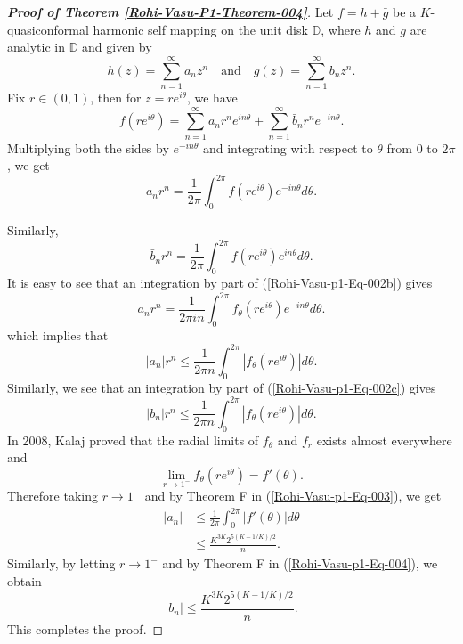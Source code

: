 \documentclass[a4paper,12pt]{amsart}
\theoremstyle{plain}
\theoremstyle{definition}
\begin{document}
\begin{proof}[{\bf Proof of Theorem   \ref{Rohi-Vasu-P1-Theorem-004}}]
 Let $f=h+\bar{g}$ be a $K$-quasiconformal harmonic self mapping on the unit disk $\mathbb{D}$, where $h$ and $g$ are analytic in $\mathbb{D}$ and given by
$$
h(z)=\sum_{n=1}^{\infty} a_n z^n \quad \text{and}
\quad g(z)=\sum_{n=1}^{\infty} b_n z^n.$$
 Fix $r\in (0,1)$, then for $z=r e^{i\theta}$, we have 
$$
f(r e^{i \theta})=\sum_{n=1}^{\infty} a_n r^n e^{i n \theta}+\sum_{n=1}^{\infty} \bar{b}_n r^n e^{-i n \theta}.
$$
Multiplying both the sides by $e^{-i n \theta}$ and integrating with respect to $\theta$ from 0 to $2 \pi$, we get
\begin{equation}\label{Rohi-Vasu-p1-Eq-002b}
a_n r^n=\frac{1}{2 \pi} \int_0^{2 \pi} f\left(r e^{i \theta}\right) e^{-i n \theta} d \theta.
\end{equation}

Similarly,
\begin{equation}\label{Rohi-Vasu-p1-Eq-002c}
\bar{b}_n r^n=\frac{1}{2 \pi} \int_0^{2 \pi} f\left(r e^{i \theta}\right) e^{i n \theta} d \theta.
\end{equation}
It is easy to see that an integration by part of (\ref{Rohi-Vasu-p1-Eq-002b}) gives
$$
 a_n r^n=\frac{1}{2 \pi i n} \int_0^{2 \pi} f_\theta\left(r e^{i \theta}\right) e^{-i n \theta} d \theta. 
$$
which implies that
\begin{equation}\label{Rohi-Vasu-p1-Eq-003}
|a_n| r^n \leq \frac{1}{2 \pi n} \int_0^{2 \pi}\left|f_\theta(r e^{i \theta})\right| d \theta.
\end{equation}
Similarly, we see that an integration by part of (\ref{Rohi-Vasu-p1-Eq-002c}) gives
\begin{equation}\label{Rohi-Vasu-p1-Eq-004}
|b_n| r^n \leq \frac{1}{2 \pi n} \int_0^{2 \pi}\left|f_\theta(r e^{i \theta})\right| d \theta.
\end{equation}
In 2008, Kalaj \cite{Kalaj-2008} proved that the radial limits of $f_\theta$ and $f_r$ exists almost everywhere and $$\lim _{r \to 1^{-}} f_\theta\left(r e^{i \theta}\right)=f'(\theta).$$
Therefore taking $r\to 1^-$ and by Theorem F in (\ref{Rohi-Vasu-p1-Eq-003}), we get
\begin{align*}
|a_n| &\leq \frac{1}{2 \pi} \int_0^{2 \pi}\left|f'(\theta)\right| d \theta \\
& \leq \frac{K^{3 K} 2^{5(K-1 / K) / 2}}{n}.
\end{align*}
Similarly, by letting $r\to 1^-$ and by Theorem F in (\ref{Rohi-Vasu-p1-Eq-004}), we obtain
$$
|b_n| \leq \frac{K^{3 K} 2^{5(K-1 / K) / 2}}{n}.
$$
This completes the proof.
\end{proof}
\end{document}
